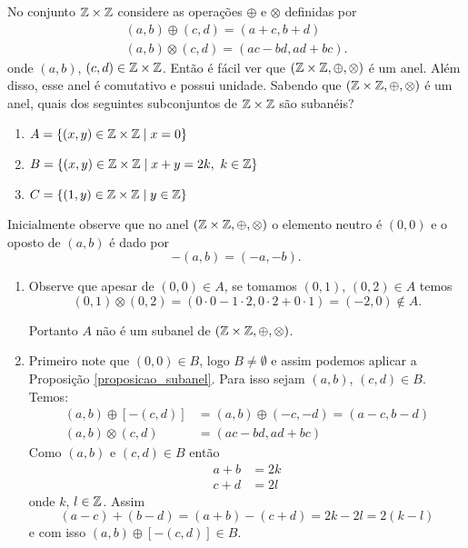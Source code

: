 \begin{exemplo}
    No conjunto $\mathbb{Z} \times \mathbb{Z}$ considere as operações $\oplus$ e $\otimes$ definidas por
    \begin{align*}
        (a, b) \oplus (c, d) = (a + c, b + d)\\
        (a ,b) \otimes (c, d) = (ac - bd, ad + bc).
    \end{align*}
    onde $(a, b)$, $(c, d) \in \mathbb{Z} \times \mathbb{Z}$. Então é fácil ver que $(\mathbb{Z} \times \mathbb{Z}, \oplus, \otimes)$ é um anel. Além disso, esse anel é comutativo e possui unidade. Sabendo que
    $(\mathbb{Z} \times \mathbb{Z}, \oplus, \otimes)$ é um anel, quais dos seguintes subconjuntos de $\mathbb{Z} \times \mathbb{Z}$ s\~ao suban\'eis?
    \begin{enumerate}[label={\alph*})]
        \item $A = \{(x, y) \in \mathbb{Z} \times \mathbb{Z} \mid x = 0\}$

        \item $B = \{(x, y) \in \mathbb{Z} \times \mathbb{Z} \mid x + y = 2k,\ k \in \mathbb{Z}\}$

        \item $C =  \{(1, y) \in \mathbb{Z} \times \mathbb{Z} \mid y \in \mathbb{Z}\}$
    \end{enumerate}
    \begin{solucao}
        Inicialmente observe que no anel $(\mathbb{Z} \times \mathbb{Z}, \oplus, \otimes)$ o elemento neutro é $(0,0)$ e o oposto de $(a, b)$ é dado por
        \[
            -(a, b) = (-a, -b).
        \]
        \begin{enumerate}[label={\alph*})]
            \item Observe que apesar de $(0, 0) \in A$, se tomamos $(0, 1)$, $(0, 2) \in A$ temos
                \[
                    (0, 1) \otimes (0, 2) = (0\cdot 0 - 1\cdot 2, 0\cdot 2 + 0\cdot 1) = (-2, 0) \notin A.
                \]

                Portanto $A$ não é um subanel de $(\mathbb{Z} \times \mathbb{Z}, \oplus, \otimes)$.

            \item Primeiro note que $(0, 0) \in B$, logo $B \ne \emptyset$ e assim podemos aplicar a Proposição \ref{proposicao_subanel}. Para isso sejam $(a, b)$, $(c, d) \in B$.
                Temos:
                \begin{align*}
                    (a, b) \oplus [-(c, d)] &= (a, b) \oplus (-c, -d) = (a - c, b - d)\\
                    (a, b) \otimes (c, d) &= (ac - bd, ad + bc)
                \end{align*}
                Como $(a, b)$ e $(c, d) \in B$ então
                \begin{align}
                    a + b &= 2k\label{primeira_condicao}\\
                    c + d &= 2l\label{segunda_condicao}
                \end{align}
                onde $k$, $l \in \mathbb{Z}$. Assim
                \[
                    (a - c) + (b - d) = (a + b) - (c + d) = 2k - 2l = 2(k - l)
                \]
                e com isso $(a, b) \oplus [-(c, d)] \in B$.


\end{enumerate}
\end{solucao}
\end{exemplo}
